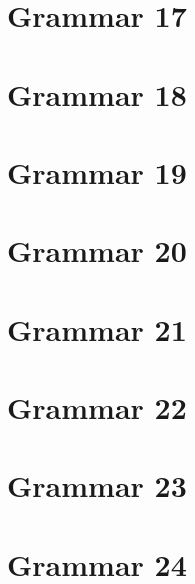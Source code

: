 \section{Grammar 17}


\section{Grammar 18}


\section{Grammar 19}


\section{Grammar 20}


\section{Grammar 21}


\section{Grammar 22}


\section{Grammar 23}


\section{Grammar 24}






